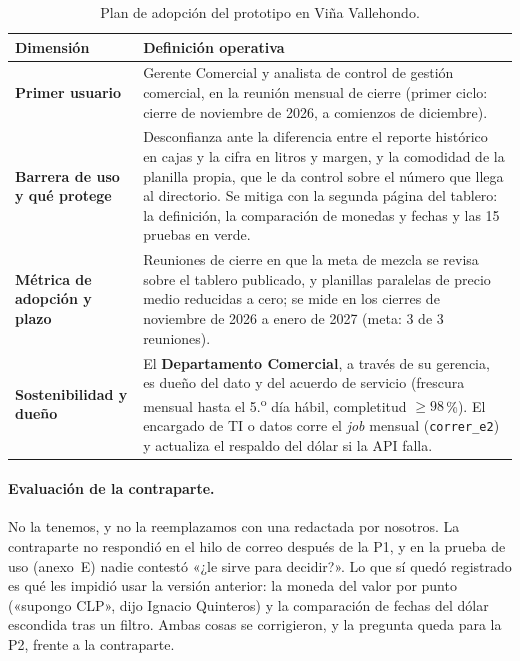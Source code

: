 \begin{table}[!htbp]
\centering\small
\caption{Plan de adopción del prototipo en Viña Vallehondo.}
\label{tab:adopcion}
\begin{tabular}{@{}p{3.2cm} p{11.8cm}@{}}
\toprule
\textbf{Dimensión} & \textbf{Definición operativa} \\
\midrule
\textbf{Primer usuario} & Gerente Comercial y analista de control de gestión comercial, en la reunión mensual de cierre (primer ciclo: cierre de noviembre de 2026, a comienzos de diciembre). \\
\midrule
\textbf{Barrera de uso y qué protege} & Desconfianza ante la diferencia entre el reporte histórico en cajas y la cifra en litros y margen, y la comodidad de la planilla propia, que le da control sobre el número que llega al directorio. Se mitiga con la segunda página del tablero: la definición, la comparación de monedas y fechas y las 15 pruebas en verde. \\
\midrule
\textbf{Métrica de adopción y plazo} & Reuniones de cierre en que la meta de mezcla se revisa sobre el tablero publicado, y planillas paralelas de precio medio reducidas a cero; se mide en los cierres de noviembre de 2026 a enero de 2027 (meta: 3 de 3 reuniones). \\
\midrule
\textbf{Sostenibilidad y dueño} & El \textbf{Departamento Comercial}, a través de su gerencia, es dueño del dato y del acuerdo de servicio (frescura mensual hasta el 5.\textsuperscript{o} día hábil, completitud $\geq 98$\,\%). El encargado de TI o datos corre el \textit{job} mensual (\texttt{correr\_e2}) y actualiza el respaldo del dólar si la API falla. \\
\bottomrule
\end{tabular}
\end{table}

\paragraph{Evaluación de la contraparte.}
No la tenemos, y no la reemplazamos con una redactada por nosotros. La contraparte no respondió en el hilo de correo después de la P1, y en la prueba de uso (anexo~E) nadie contestó «¿le sirve para decidir?». Lo que sí quedó registrado es qué les impidió usar la versión anterior: la moneda del valor por punto («supongo CLP», dijo Ignacio Quinteros) y la comparación de fechas del dólar escondida tras un filtro. Ambas cosas se corrigieron, y la pregunta queda para la P2, frente a la contraparte.
